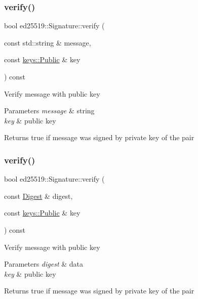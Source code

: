 \subsubsection{\texorpdfstring{verify()}{verify()}\hspace{0.1cm}{\footnotesize\ttfamily [2/3]}}
{\footnotesize\ttfamily bool ed25519\+::\+Signature\+::verify (\begin{DoxyParamCaption}\item[{const std\+::string \&}]{message,  }\item[{const \mbox{\hyperlink{classed25519_1_1keys_1_1_public}{keys\+::\+Public}} \&}]{key }\end{DoxyParamCaption}) const}

Verify message with public key 
\begin{DoxyParams}{Parameters}
{\em message} & string \\
\hline
{\em key} & public key \\
\hline
\end{DoxyParams}
\begin{DoxyReturn}{Returns}
true if message was signed by private key of the pair 
\end{DoxyReturn}
\mbox{\label{classed25519_1_1_signature_a906ffca7764e7879438a9c60d96ff207}} 
\subsubsection{\texorpdfstring{verify()}{verify()}\hspace{0.1cm}{\footnotesize\ttfamily [3/3]}}
{\footnotesize\ttfamily bool ed25519\+::\+Signature\+::verify (\begin{DoxyParamCaption}\item[{const \mbox{\hyperlink{classed25519_1_1_digest}{Digest}} \&}]{digest,  }\item[{const \mbox{\hyperlink{classed25519_1_1keys_1_1_public}{keys\+::\+Public}} \&}]{key }\end{DoxyParamCaption}) const}

Verify message with public key 
\begin{DoxyParams}{Parameters}
{\em digest} & data \\
\hline
{\em key} & public key \\
\hline
\end{DoxyParams}
\begin{DoxyReturn}{Returns}
true if message was signed by private key of the pair 
\end{DoxyReturn}


